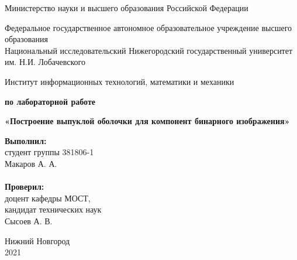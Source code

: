 \documentclass{report}
\begin{document}
\begin{titlepage}

\begin{center}
Министерство науки и высшего образования Российской Федерации
\end{center}

\begin{center}
Федеральное государственное автономное образовательное учреждение высшего образования \\
Национальный исследовательский Нижегородский государственный университет им. Н.И. Лобачевского
\end{center}

\begin{center}
Институт информационных технологий, математики и механики
\end{center}

\vspace{4em}

\begin{center}
\textbf{ по лабораторной работе} \\
\end{center}
\begin{center}
\textbf{\Large«Построение выпуклой оболочки для компонент бинарного изображения»} \\
\end{center}

\vspace{4em}

\newbox{\lbox}
\newlength{\maxl}
\setlength{\maxl}{\wd\lbox}
\hfill\parbox{7cm}{
\hspace*{5cm}\hspace*{-5cm}\textbf{Выполнил:} \\ студент группы 381806-1 \\ Макаров А. А.\\
\\
\hspace*{5cm}\hspace*{-5cm}\textbf{Проверил:}\\ доцент кафедры МОСТ, \\ кандидат технических наук \\ Сысоев А. В.\\
}
\vspace{\fill}

\begin{center} Нижний Новгород \\ 2021 \end{center}

\end{titlepage}
\end{document}
